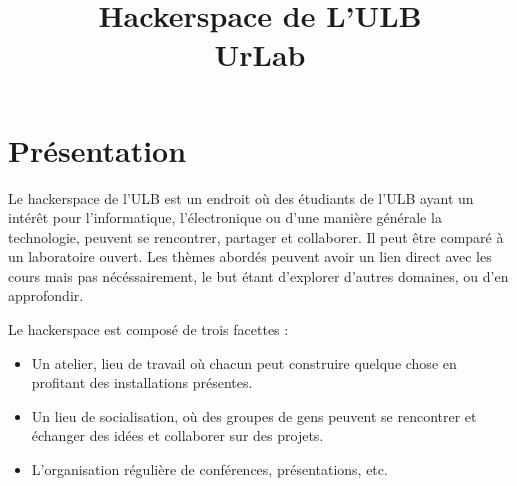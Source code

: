 \documentclass{article}
\title{Hackerspace de L'ULB\\ \fontsize{90}{100}\selectfont UrLab}
\author{ }
\begin{document}
\maketitle{}
\newpage
\tableofcontents
\newpage
\setlength{\parskip}{0.5ex plus 0.2ex minus 0.2ex}
\setlength{\parindent}{0pt}

\section{Présentation}

Le hackerspace de l'ULB est un endroit où des étudiants de l'ULB ayant un intérêt 
pour l'informatique, l'électronique ou d'une manière générale la technologie, 
peuvent se rencontrer, partager et collaborer. Il peut être comparé à un laboratoire ouvert.
Les thèmes abordés peuvent avoir un lien direct avec les cours mais pas nécéssairement, le but étant d'explorer d'autres domaines, ou d'en approfondir.

Le hackerspace est composé de trois facettes : 
\begin{itemize}
\item Un atelier, lieu de travail où chacun peut construire quelque chose en profitant 
des installations présentes.
\item Un lieu de socialisation, où des groupes de gens peuvent se rencontrer
et échanger des idées et collaborer sur des projets.
\item L'organisation régulière de conférences, présentations, etc.\end{itemize}
\end{document}

